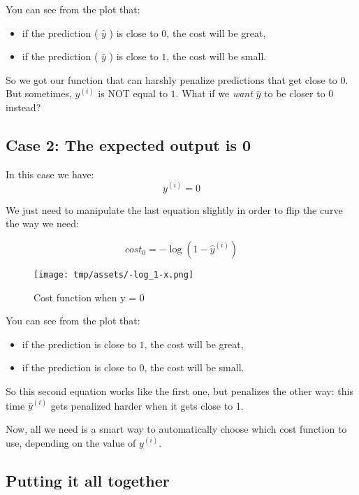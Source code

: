 \documentclass[]{article}
\begin{document}
You can see from the plot that:

\begin{itemize}
\item
  if the prediction ( \(\hat{y}\) ) is close to \(0\), the cost will be
  great,
\item
  if the prediction ( \(\hat{y}\) ) is close to \(1\), the cost will be
  small.
\end{itemize}

So we got our function that can harshly penalize predictions that get
close to \(0\). But sometimes, \(y^{(i)}\) is NOT equal to \(1\). What
if we \emph{want} \(\hat{y}\) to be closer to \(0\) instead?

\hypertarget{case-2-the-expected-output-is-0}{%
\subsection{Case 2: The expected output is
0}\label{case-2-the-expected-output-is-0}}

In this case we have: \large \[
y^{(i)} = 0
\] \normalsize

We just need to manipulate the last equation slightly in order to flip
the curve the way we need:

\large

\[
cost_0 = -\log(1 - \hat{y}^{(i)})
\] \normalsize

\begin{figure}
\centering
\texttt{[image: tmp/assets/-log\_1-x.png]}
\caption{Cost function when y = 0}
\end{figure}

You can see from the plot that:

\begin{itemize}
\item
  if the prediction is close to \(1\), the cost will be great,
\item
  if the prediction is close to \(0\), the cost will be small.
\end{itemize}

So this second equation works like the first one, but penalizes the
other way: this time \(\hat{y}^{(i)}\) gets penalized harder when it
gets close to 1.

Now, all we need is a smart way to automatically choose which cost
function to use, depending on the value of \(y^{(i)}\).

\hypertarget{putting-it-all-together}{%
\subsection{Putting it all together}\label{putting-it-all-together}}
\end{document}
